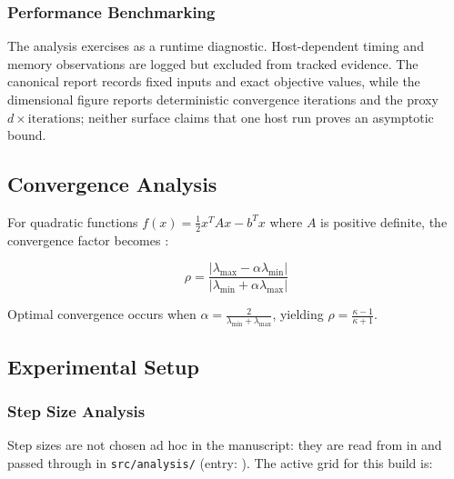 \documentclass[
  english,
]{article}
\begin{document}
\subsubsection{Performance Benchmarking}\label{performance-benchmarking}

The analysis exercises
\href{https://github.com/docxology/template/blob/main/infrastructure/scientific/benchmarking.py}{}
as a runtime diagnostic. Host-dependent timing and memory observations
are logged but excluded from tracked evidence. The canonical report
records fixed inputs and exact objective values, while the dimensional
figure reports deterministic convergence iterations and the proxy
\(d \times \text{iterations}\); neither surface claims that one host run
proves an asymptotic bound.

\subsection{Convergence Analysis}\label{convergence-analysis}

For quadratic functions \(f(x) = \frac{1}{2}x^T A x - b^T x\) where
\(A\) is positive definite, the convergence factor becomes
\citep{bertsekas1999nonlinear}:

\begin{equation}
\label{eq:convergence_factor}
\rho = \frac{|\lambda_{\max} - \alpha\lambda_{\min}|}{|\lambda_{\min} + \alpha\lambda_{\max}|}
\end{equation}

Optimal convergence occurs when
\(\alpha = \frac{2}{\lambda_{\min} + \lambda_{\max}}\), yielding
\(\rho = \frac{\kappa - 1}{\kappa + 1}\).

\subsection{Experimental Setup}\label{experimental-setup}

\subsubsection{Step Size Analysis}\label{step-size-analysis}

Step sizes are not chosen ad hoc in the manuscript: they are read from
 in  and
passed through  in
\texttt{src/analysis/} (entry:
). The active grid for this
build is:
\end{document}
